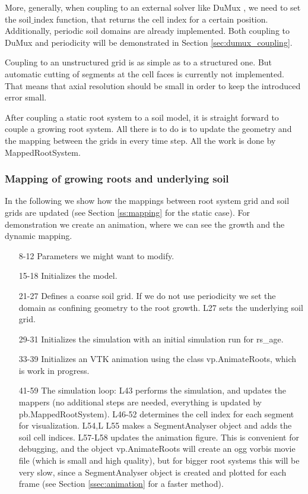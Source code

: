 More, generally, when coupling to an external solver like DuMux \citep{koch2020dumux}, we need to set the soil$\_$index function, that returns the cell index for a certain position. Additionally, periodic soil domains are already implemented. Both coupling to DuMux and periodicity will be demonstrated in Section \ref{sec:dumux_coupling}.

Coupling to an unstructured grid is as simple as to a structured one. But automatic cutting of segments at the cell faces is currently not implemented. That means that axial resolution should be small in order to keep the introduced error small.




After coupling a static root system to a soil model, it is straight forward to couple a growing root system. All there is to do is to update the geometry and the mapping between the grids in every time step. All the work is done by MappedRootSystem.

    
\subsubsection*{Mapping of growing roots and underlying soil} 

In the following we show how the mappings between root system grid and soil grids are updated (see Section \ref{ss:mapping} for the static case). For demonstration we create an animation, where we can see the growth and the dynamic mapping. 



\begin{itemize}
\item[8-12] Parameters we might want to modify. 
\item[15-18] Initializes the model.
\item[21-27] Defines a coarse soil grid. If we do not use periodicity we set the domain as confining geometry to the root growth. L27 sets the underlying soil grid.
\item[29-31] Initializes the simulation with an initial simulation run for rs\_age.
\item[33-39] Initializes an VTK animation using the class vp.AnimateRoots, which is work in progress. 
\item[41-59] The simulation loop: L43 performs the simulation, and updates the mappers (no additional steps are needed, everything is updated by pb.MappedRootSystem). L46-52 determines the cell index for each segment for visualization. L54,L L55 makes a SegmentAnalyser object and adds the soil cell indices. L57-L58 updates the animation figure. This is convenient for debugging, and the object vp.AnimateRoots will create an ogg vorbis movie file (which is small and high quality), but for bigger root systems this will be very slow, since a SegmentAnalyser object is created and plotted for each frame (see Section \ref{ssec:animation} for a faster method).
\end{itemize}
